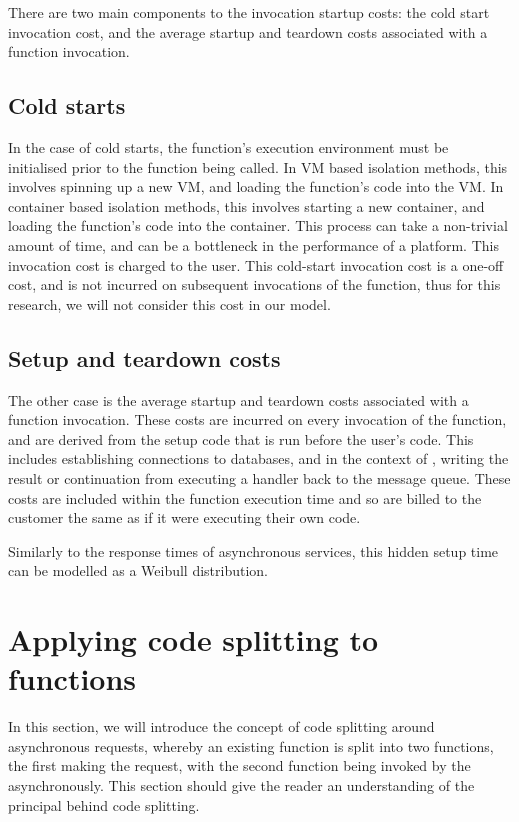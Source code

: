 There are two main components to the invocation startup costs: the cold start invocation cost, and the average startup and teardown costs associated with a function invocation.

\subsection{Cold starts}
In the case of cold starts, the function's execution environment must be initialised prior to the function being called. In VM based isolation methods, this involves spinning up a new VM, and loading the function's code into the VM. In container based isolation methods, this involves starting a new container, and loading the function's code into the container. This process can take a non-trivial amount of time, and can be a bottleneck in the performance of a \faas{} platform. This invocation cost is charged to the user. This cold-start invocation cost is a one-off cost, and is not incurred on subsequent invocations of the function, thus for this research, we will not consider this cost in our model.

\subsection{Setup and teardown costs}
The other case is the average startup and teardown costs associated with a function invocation. These costs are incurred on every invocation of the function, and are derived from the setup code that is run before the user's code. This includes establishing connections to databases, and in the context of \faaas{}, writing the result or continuation from executing a handler back to the message queue. These costs are included within the function execution time and so are billed to the customer the same as if it were executing their own code.

Similarly to the response times of asynchronous services, this hidden setup time can be modelled as a Weibull distribution.

\section{Applying code splitting to \faas{} functions}
\label{sec:faas-code-splitting}
In this section, we will introduce the concept of code splitting around asynchronous requests, whereby an existing function is split into two functions, the first making the request, with the second function being invoked by the  asynchronously. This section should give the reader an understanding of the principal behind code splitting.

